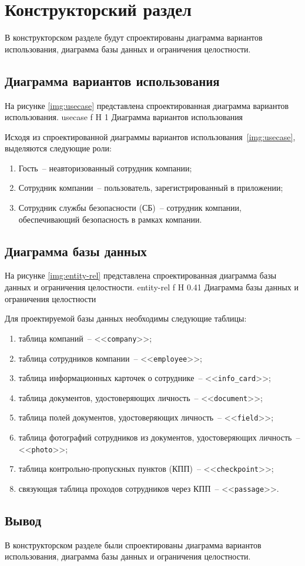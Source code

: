 \chapter{Конструкторский раздел}

В конструкторском разделе будут спроектированы диаграмма вариантов использования, диаграмма базы данных и ограничения целостности.

\section{Диаграмма вариантов использования}

На рисунке \ref{img:usecase} представлена спроектированная диаграмма вариантов использования.
	{usecase}
	{f}
	{H}
	{1\textwidth}
	{Диаграмма вариантов использования}
	
Исходя из спроектированной диаграммы вариантов использования~\ref{img:usecase}, выделяются следующие роли:
\begin{enumerate}
	\item Гость~-- неавторизованный сотрудник компании;
	\item Сотрудник компании~-- пользователь, зарегистрированный в приложении;
	\item Сотрудник службы безопасности (СБ)~-- сотрудник компании, обеспечивающий безопасность в рамках компании.
\end{enumerate}
	
\section{Диаграмма базы данных}

На рисунке \ref{img:entity-rel} представлена спроектированная диаграмма базы данных и ограничения целостности.
	{entity-rel}
	{f}
	{H}
	{0.41\textwidth}
	{Диаграмма базы данных и ограничения целостности}

Для проектируемой базы данных необходимы следующие таблицы:
\begin{enumerate}
	\item таблица компаний~-- <<\texttt{company}>>;
	\item таблица сотрудников компании~-- <<\texttt{employee}>>;
	\item таблица информационных карточек о сотруднике~-- <<\texttt{info\_card}>>;
	\item таблица документов, удостоверяющих личность~-- <<\texttt{document}>>;
	\item таблица полей документов, удостоверяющих личность~-- <<\texttt{field}>>;
	\item таблица фотографий сотрудников из документов, удостоверяющих личность~-- <<\texttt{photo}>>;
	\item таблица контрольно-пропускных пунктов (КПП)~-- <<\texttt{checkpoint}>>;
	\item связующая таблица проходов сотрудников через КПП~-- <<\texttt{passage}>>.
\end{enumerate}

\section{Вывод}

В конструкторском разделе были спроектированы диаграмма вариантов использования, диаграмма базы данных и ограничения целостности.